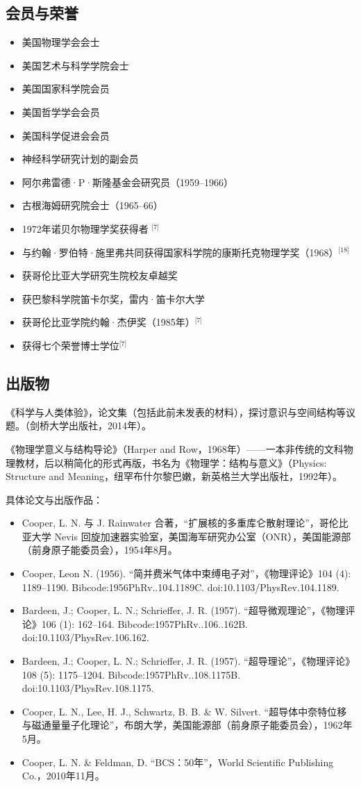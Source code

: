 \subsection{会员与荣誉}
\begin{itemize}
\item 美国物理学会会士 
\item 美国艺术与科学学院会士 
\item 美国国家科学院会员
\item 美国哲学学会会员 
\item 美国科学促进会会员 
\item 神经科学研究计划的副会员 
\item 阿尔弗雷德·P·斯隆基金会研究员（1959–1966）
\item 古根海姆研究院会士（1965–66）
\item 1972年诺贝尔物理学奖获得者 \(^\text{[7]}\)
\item 与约翰·罗伯特·施里弗共同获得国家科学院的康斯托克物理学奖（1968）\(^\text{[18]}\)
\item 获哥伦比亚大学研究生院校友卓越奖 
\item 获巴黎科学院笛卡尔奖，雷内·笛卡尔大学
\item 获哥伦比亚学院约翰·杰伊奖（1985年）\(^\text{[7]}\)
\item 获得七个荣誉博士学位\(^\text{[7]}\)
\end{itemize}
\subsection{出版物}
《科学与人类体验》，论文集（包括此前未发表的材料），探讨意识与空间结构等议题。（剑桥大学出版社，2014年）。

《物理学意义与结构导论》（Harper and Row，1968年）——一本非传统的文科物理教材，后以稍简化的形式再版，书名为《物理学：结构与意义》（Physics: Structure and Meaning，纽罕布什尔黎巴嫩，新英格兰大学出版社，1992年）。

具体论文与出版作品：
\begin{itemize}
\item Cooper, L. N. 与 J. Rainwater 合著，“扩展核的多重库仑散射理论”，哥伦比亚大学 Nevis 回旋加速器实验室，美国海军研究办公室（ONR），美国能源部（前身原子能委员会），1954年8月。
\item Cooper, Leon N. (1956). “简并费米气体中束缚电子对”，《物理评论》104 (4): 1189–1190. Bibcode:1956PhRv..104.1189C. doi:10.1103/PhysRev.104.1189.
\item Bardeen, J.; Cooper, L. N.; Schrieffer, J. R. (1957). “超导微观理论”，《物理评论》106 (1): 162–164. Bibcode:1957PhRv..106..162B. doi:10.1103/PhysRev.106.162.
\item Bardeen, J.; Cooper, L. N.; Schrieffer, J. R. (1957). “超导理论”，《物理评论》108 (5): 1175–1204. Bibcode:1957PhRv..108.1175B. doi:10.1103/PhysRev.108.1175.
\item Cooper, L. N., Lee, H. J., Schwartz, B. B. & W. Silvert. “超导体中奈特位移与磁通量量子化理论”，布朗大学，美国能源部（前身原子能委员会），1962年5月。
\item Cooper, L. N. & Feldman, D. “BCS：50年”，World Scientific Publishing Co.，2010年11月。
\end{itemize}

